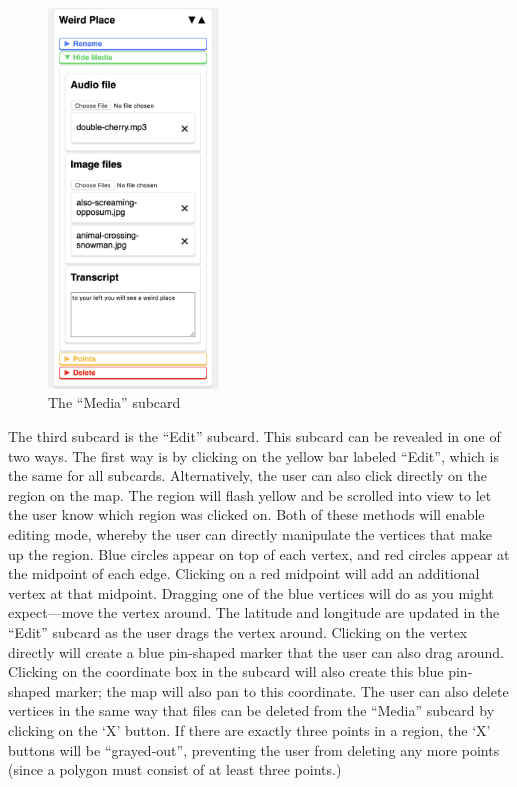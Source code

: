 \documentclass[a4paper, 10pt, american, titlepage]{article}
\begin{document}
\begin{figure}[h]
	\centering
	\includegraphics[width=0.4\textwidth]{media-subcard-editour.png}
	\caption{The ``Media'' subcard}
	\label{fig:mediaSubcard}
\end{figure}

The third subcard is the ``Edit'' subcard. This subcard can be revealed in one
of two ways. The first way is by clicking on the yellow bar labeled ``Edit'',
which is the same for all subcards. Alternatively, the user can also click
directly on the region on the map. The region will flash yellow and be scrolled
into view to let the user know which region was clicked on. Both of these
methods will enable editing mode, whereby the user can directly manipulate the
vertices that make up the region. Blue circles appear on top of each vertex,
and red circles appear at the midpoint of each edge. Clicking on a red midpoint
will add an additional vertex at that midpoint. Dragging one of the blue
vertices will do as you might expect---move the vertex around. The latitude and
longitude are updated in the ``Edit'' subcard as the user drags the vertex
around. Clicking on the vertex directly will create a blue pin-shaped marker
that the user can also drag around. Clicking on the coordinate box in the
subcard will also create this blue pin-shaped marker; the map will also pan to
this coordinate. The user can also delete vertices in the same way that files
can be deleted from the ``Media'' subcard by clicking on the `X' button. If there
are exactly three points in a region, the `X' buttons will be ``grayed-out'',
preventing the user from deleting any more points (since a polygon must consist
of at least three points.)
\end{document}
